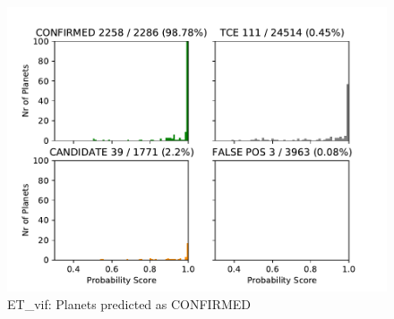 
\begin{figure}[H]
                \begin{mdframed}[linecolor=green]
                \centering
                \includegraphics[width = 1\textwidth,height=.4\textheight]{data/ET_vif_pred_confirm.pdf}
                \caption{ET\_vif: Planets predicted as CONFIRMED}
                \label{fig:data/ET_vif_pred_confirm}
                \end{mdframed}
                \end{figure}